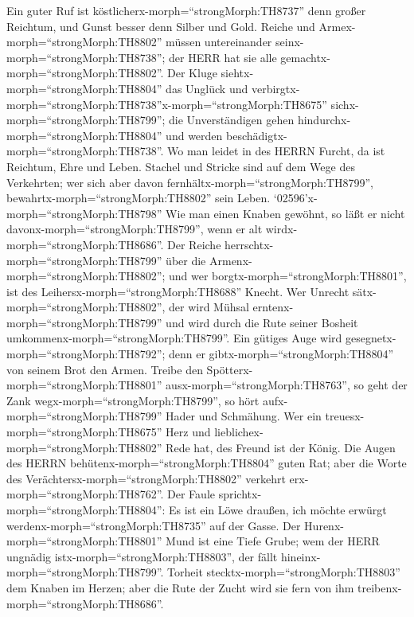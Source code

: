  Ein guter Ruf ist köstlicherx-morph=``strongMorph:TH8737''
denn großer Reichtum, und Gunst besser denn Silber und Gold.
 Reiche und Armex-morph=``strongMorph:TH8802'' müssen
untereinander seinx-morph=``strongMorph:TH8738''; der HERR hat sie alle
gemachtx-morph=``strongMorph:TH8802''.  Der Kluge
siehtx-morph=``strongMorph:TH8804'' das Unglück und
verbirgtx-morph=``strongMorph:TH8738''\textbar x-morph=``strongMorph:TH8675''
sichx-morph=``strongMorph:TH8799''; die Unverständigen gehen
hindurchx-morph=``strongMorph:TH8804'' und werden
beschädigtx-morph=``strongMorph:TH8738''.  Wo man leidet in
des HERRN Furcht, da ist Reichtum, Ehre und Leben.  Stachel
und Stricke sind auf dem Wege des Verkehrten; wer sich aber davon
fernhältx-morph=``strongMorph:TH8799'',
bewahrtx-morph=``strongMorph:TH8802'' sein Leben. 
`02596'\textbar x-morph=``strongMorph:TH8798'' Wie man einen Knaben
gewöhnt, so läßt er nicht davonx-morph=``strongMorph:TH8799'', wenn er
alt wirdx-morph=``strongMorph:TH8686''.  Der Reiche
herrschtx-morph=``strongMorph:TH8799'' über die
Armenx-morph=``strongMorph:TH8802''; und wer
borgtx-morph=``strongMorph:TH8801'', ist des
Leihersx-morph=``strongMorph:TH8688'' Knecht.  Wer Unrecht
sätx-morph=``strongMorph:TH8802'', der wird Mühsal
erntenx-morph=``strongMorph:TH8799'' und wird durch die Rute seiner
Bosheit umkommenx-morph=``strongMorph:TH8799''.  Ein gütiges
Auge wird gesegnetx-morph=``strongMorph:TH8792''; denn er
gibtx-morph=``strongMorph:TH8804'' von seinem Brot den Armen.
 Treibe den Spötterx-morph=``strongMorph:TH8801''
ausx-morph=``strongMorph:TH8763'', so geht der Zank
wegx-morph=``strongMorph:TH8799'', so hört
aufx-morph=``strongMorph:TH8799'' Hader und Schmähung.  Wer
ein treuesx-morph=``strongMorph:TH8675'' Herz und
lieblichex-morph=``strongMorph:TH8802'' Rede hat, des Freund ist der
König.  Die Augen des HERRN
behütenx-morph=``strongMorph:TH8804'' guten Rat; aber die Worte des
Verächtersx-morph=``strongMorph:TH8802'' verkehrt
erx-morph=``strongMorph:TH8762''.  Der Faule
sprichtx-morph=``strongMorph:TH8804'': Es ist ein Löwe draußen, ich
möchte erwürgt werdenx-morph=``strongMorph:TH8735'' auf der Gasse.
 Der Hurenx-morph=``strongMorph:TH8801'' Mund ist eine
Tiefe Grube; wem der HERR ungnädig istx-morph=``strongMorph:TH8803'',
der fällt hineinx-morph=``strongMorph:TH8799''.  Torheit
stecktx-morph=``strongMorph:TH8803'' dem Knaben im Herzen; aber die Rute
der Zucht wird sie fern von ihm treibenx-morph=``strongMorph:TH8686''.
